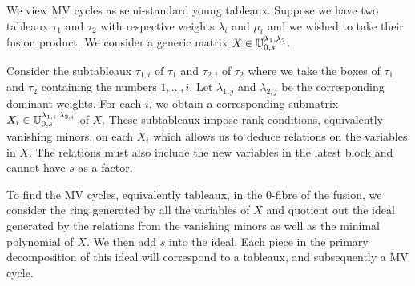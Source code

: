 \documentclass[draft]{article}
\begin{document}

We view MV cycles as semi-standard young tableaux. Suppose we have two tableaux $\tau_1$ and $\tau_2$ with respective weights $\lambda_i$ and $\mu_i$ and we wished to take their fusion product. We consider a generic matrix $X \in \mathbb U^{\lambda_1,\lambda_2}_{0,s}$. 

Consider the subtableaux $\tau_{1,i}$ of $\tau_1$ and $\tau_{2,i}$ of $\tau_2$ where we take the boxes of $\tau_1$ and $\tau_2$ containing the numbers $1,\dots,i$. Let $\lambda_{1,j}$ and $\lambda_{2,j}$ be the corresponding dominant weights. For each $i$, we obtain a corresponding submatrix $X_i \in \mathbb U^{\lambda_{1,i}, \lambda_{2,i}}_{0,s}$ of $X$. These subtableaux impose rank conditions, equivalently vanishing minors, on each $X_i$ which allows us to deduce relations on the variables in $X$. The relations must also include the new variables in the latest block and cannot have $s$ as a factor.

To find the MV cycles, equivalently tableaux, in the $0$-fibre of the fusion, we consider the ring generated by all the variables of $X$ and quotient out the ideal generated by the relations from the vanishing minors as well as the minimal polynomial of $X$. We then add $s$ into the ideal. Each piece in the primary decomposition of this ideal will correspond to a tableaux, and subsequently a MV cycle.
\end{document}
